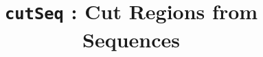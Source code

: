 

\pagestyle{noweb}

\title{\texttt{cutSeq} : Cut Regions from Sequences}
\author{}

\date{}
\maketitle





